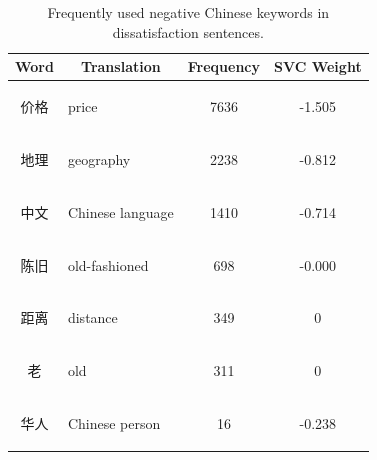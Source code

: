 \documentclass[review]{elsarticle}
\begin{document}

\begin{table}[hbp] \centering
\caption{Frequently used negative Chinese keywords in dissatisfaction sentences.}
\label{tab:neg_keys_zh}
\begin{tabular}{|c|l|c|c|} \hline
\textbf{Word} & \multicolumn{1}{c|}{\textbf{Translation}} & \textbf{Frequency} & \textbf{SVC Weight} \\ \hline
\begin{CJK}{UTF8}{gbsn} 价格 \end{CJK} 
    & price 
        & 7636 & -1.505 \\ \hline
\begin{CJK}{UTF8}{gbsn} 地理 \end{CJK} 
    & geography 
        & 2238 & -0.812 \\ \hline
\begin{CJK}{UTF8}{gbsn} 中文 \end{CJK} 
    & Chinese language 
        & 1410 & -0.714 \\ \hline
\begin{CJK}{UTF8}{gbsn} 陈旧 \end{CJK} 
    & old-fashioned 
        & 698 & -0.000 \\ \hline
\begin{CJK}{UTF8}{gbsn} 距离 \end{CJK} 
    & distance 
        & 349 & 0 \\ \hline
\begin{CJK}{UTF8}{gbsn} 老 \end{CJK} 
    & old 
        & 311 & 0 \\ \hline
\begin{CJK}{UTF8}{gbsn} 华人 \end{CJK} 
    & Chinese person 
        & 16 & -0.238 \\ \hline
\end{tabular}
\end{table}


\end{document}
